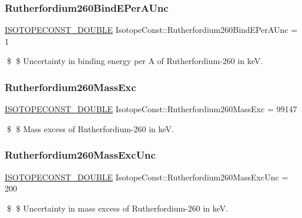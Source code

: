 \subsubsection{\texorpdfstring{Rutherfordium260\+Bind\+E\+Per\+A\+Unc}{Rutherfordium260BindEPerAUnc}}
{\footnotesize\ttfamily \mbox{\hyperlink{group___isotope_const-_macros_ga8f45a7272ce02c0b4c65c44636ed719a}{I\+S\+O\+T\+O\+P\+E\+C\+O\+N\+S\+T\+\_\+\+D\+O\+U\+B\+LE}} Isotope\+Const\+::\+Rutherfordium260\+Bind\+E\+Per\+A\+Unc = 1}

\$ \$ Uncertainty in binding energy per A of Rutherfordium-\/260 in keV. \mbox{\label{group___isotope_const-_rutherfordium-_rf260_ga88239c756b0bcefc4741c3175202dc76}} 
\subsubsection{\texorpdfstring{Rutherfordium260\+Mass\+Exc}{Rutherfordium260MassExc}}
{\footnotesize\ttfamily \mbox{\hyperlink{group___isotope_const-_macros_ga8f45a7272ce02c0b4c65c44636ed719a}{I\+S\+O\+T\+O\+P\+E\+C\+O\+N\+S\+T\+\_\+\+D\+O\+U\+B\+LE}} Isotope\+Const\+::\+Rutherfordium260\+Mass\+Exc = 99147}

\$ \$ Mass excess of Rutherfordium-\/260 in keV. \mbox{\label{group___isotope_const-_rutherfordium-_rf260_gaad615c85c459358c14d177f6dfb2845e}} 
\subsubsection{\texorpdfstring{Rutherfordium260\+Mass\+Exc\+Unc}{Rutherfordium260MassExcUnc}}
{\footnotesize\ttfamily \mbox{\hyperlink{group___isotope_const-_macros_ga8f45a7272ce02c0b4c65c44636ed719a}{I\+S\+O\+T\+O\+P\+E\+C\+O\+N\+S\+T\+\_\+\+D\+O\+U\+B\+LE}} Isotope\+Const\+::\+Rutherfordium260\+Mass\+Exc\+Unc = 200}

\$ \$ Uncertainty in mass excess of Rutherfordium-\/260 in keV. \mbox{\label{group___isotope_const-_rutherfordium-_rf260_gad2b0c86e1f1574f940dc3df41632a0eb}} 
